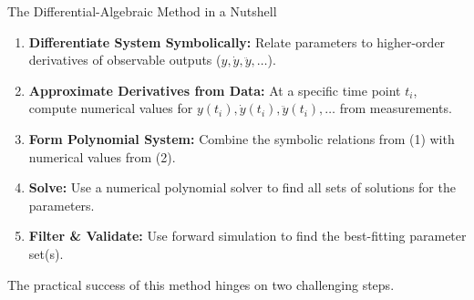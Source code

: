\documentclass[aspectratio=169]{beamer}
\begin{document}
\begin{frame}{The Differential-Algebraic Method in a Nutshell}
    \begin{enumerate}
        \item \textbf{Differentiate System Symbolically:} Relate parameters to higher-order derivatives of observable outputs ($y, \dot{y}, \ddot{y}, \dots$).
        \pause
        \item \textbf{Approximate Derivatives from Data:} At a specific time point $t_i$, compute numerical values for $y(t_i), \dot{y}(t_i), \ddot{y}(t_i), \ldots$ from measurements.
        \pause
        \item \textbf{Form Polynomial System:} Combine the symbolic relations from (1) with numerical values from (2).
        \pause
        \item \textbf{Solve:} Use a numerical polynomial solver to find all sets of solutions for the parameters.
        \pause
        \item \textbf{Filter \& Validate:} Use forward simulation to find the best-fitting parameter set(s).
    \end{enumerate}
    \vspace{1em}
    \begin{alertblock}{}
        \centering
        \small The practical success of this method hinges on two challenging steps.
    \end{alertblock}
\end{frame}
\end{document}
